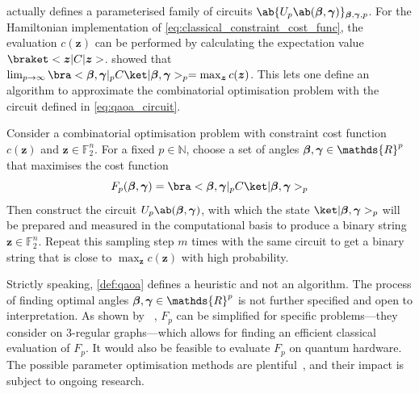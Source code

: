 actually defines a parameterised family of circuits $\ab\{U_p \ab(\bm{\mangle}, \bm{\pangle})\}_{\bm{\mangle}, \bm{\pangle}, p}$. For the Hamiltonian implementation of \cref{eq:classical_constraint_cost_func}, the evaluation $c(\bm{z})$ can be performed by calculating the expectation value $\braket<\bm{z}|C|\bm{z}>$. \citeauthor{farhi2014quantum} showed that $\lim_{p \to \infty} \bra<\bm{\mangle}, \bm{\pangle}|_p C \ket|\bm{\mangle}, \bm{\pangle}>_p = \max_{\bm{z}} c(\bm{z})$. This lets one define an algorithm to approximate the combinatorial optimisation problem with the circuit defined in \cref{eq:qaoa_circuit}.

\begin{definition}[\QAOA]
  \label{def:qaoa}
    Consider a combinatorial optimisation problem with constraint cost function $c(\bm{z})$ and $\bm{z} \in \mathds{F}_2^n$. For a fixed $p \in \mathds{N}$, choose a set of angles $\bm{\mangle}, \bm{\pangle} \in \mathds{R}^p$ that maximises the \QAOA cost function 
  \begin{equation}
      F_p(\bm{\mangle}, \bm{\pangle}) = \bra<\bm{\mangle}, \bm{\pangle}|_p C \ket|\bm{\mangle}, \bm{\pangle}>_p
  \end{equation}
    Then construct the circuit $U_p\ab(\bm{\mangle}, \bm{\pangle})$, with which the state $\ket|\bm{\mangle}, \bm{\pangle}>_p$ will be prepared and measured in the computational basis to produce a binary string $\bm{z} \in \mathds{F}_2^n$. Repeat this sampling step $m$ times with the same circuit to get a binary string that is close to $\max_{\bm{z}} c(\bm{z})$ with high probability.
\end{definition}

Strictly speaking, \cref{def:qaoa} defines a heuristic and not an algorithm. The process of finding optimal angles $\bm{\mangle}, \bm{\pangle} \in \mathds{R}^p$ is not further specified and open to interpretation. As shown by \citeauthor{farhi2014quantum}~\cite{farhi2014quantum}, $F_p$ can be simplified for specific problems---they 
consider \maxcut on 3-regular graphs---which allows for finding an efficient classical evaluation of $F_p$. It would also be feasible to evaluate $F_p$ on quantum hardware. The possible parameter optimisation methods are plentiful~\cite{FernndezPends:2022,PellowJarman:2024,blekos_review_2024}, and their
impact is subject to ongoing research.


